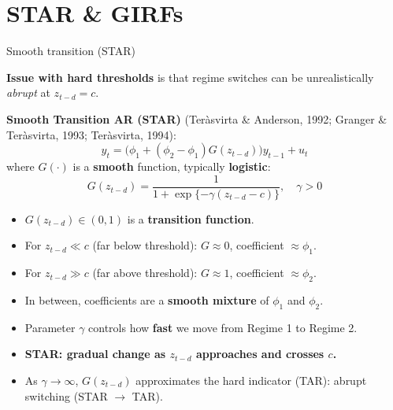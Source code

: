 \documentclass{beamer}
\begin{document}
 \section{STAR \& GIRFs}
 
\begin{frame}{Smooth transition (STAR)}
\footnotesize

\textbf{Issue with hard thresholds} is that regime switches can be unrealistically
\emph{abrupt} at $z_{t-d} = c$.

\medskip
\textbf{Smooth Transition AR (STAR)} (Ter\`{a}svirta \& Anderson, 1992; Granger \& Ter\`{a}svirta, 1993; Ter\`{a}svirta, 1994):
\[
y_t = \big( \phi_1 + (\phi_2 - \phi_1) G(z_{t-d}) \big) y_{t-1} + u_t
\]
where $G(\cdot)$ is a \textbf{smooth }function, typically\textbf{ logistic}:
\[
G(z_{t-d}) = 
\frac{1}{1 + \exp\{-\gamma (z_{t-d} - c)\}},
\quad \gamma > 0
\]

\begin{itemize}
  \item $G(z_{t-d}) \in (0,1)$ is a \textbf{transition function}.
  \item For $z_{t-d} \ll c$ (far below threshold): $G \approx 0$, coefficient $\approx \phi_1$.
  \item For $z_{t-d} \gg c$ (far above threshold): $G \approx 1$, coefficient $\approx \phi_2$.
  \item   In between, coefficients are a \textbf{smooth mixture} of $\phi_1$ and $\phi_2$.
  \item Parameter $\gamma$ controls how \textbf{fast} we move from Regime 1 to Regime 2.
\end{itemize}

\begin{itemize}
  \item \textbf{STAR: gradual change as $z_{t-d}$ approaches and crosses $c$.}
  \item As $\gamma \to \infty$, $G(z_{t-d})$ approximates the hard indicator (TAR): abrupt switching (STAR $\to$ TAR).
\end{itemize}

\end{frame}
\end{document}
